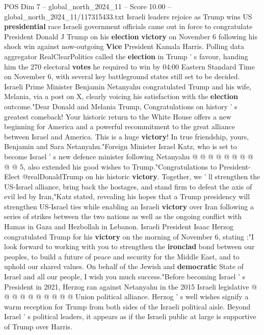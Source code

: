 \begin{textsample}{POS Dim 7 – global\_north\_2024\_11 – Score 10.00 – global\_north\_2024\_11/117315433.txt}  \label{ex:f7_pos_119}
Israeli leaders rejoice as Trump wins US \textbf{presidential} race Israeli government officials came out in force to congratulate President Donald J Trump on his \textbf{election} \textbf{victory} on November 6 following his shock win against now-outgoing \textbf{Vice} President Kamala Harris.
Polling data aggregator RealClearPolitics called the \textbf{election} in Trump ' s favour, handing him the 270 electoral \textbf{votes} he required to win by 04:00 Eastern Standard Time on November 6, with several key battleground states still set to be decided.
Israeli Prime Minister Benjamin Netanyahu congratulated Trump and his wife, Melania, via a post on X, clearly voicing his satisfaction with the \textbf{election} outcome."Dear Donald and Melania Trump, Congratulations on history ' s greatest comeback!
Your historic return to the White House offers a new beginning for America and a powerful recommitment to the great alliance between Israel and America.
This is a huge \textbf{victory}!
In true friendship, yours, Benjamin and Sara Netanyahu."Foreign Minister Israel Katz, who is set to become Israel ' s new defence minister following Netanyahu @ @ @ @ @ @ @ @ @ @ 5, also extended his good wishes to Trump."Congratulations to President-Elect @realDonaldTrump on his historic \textbf{victory}.
Together, we ' ll strengthen the US-Israel alliance, bring back the hostages, and stand firm to defeat the axis of evil led by Iran,"Katz stated, revealing his hopes that a Trump presidency will strengthen US-Israel ties while enabling an Israeli \textbf{victory} over Iran following a series of strikes between the two nations as well as the ongoing conflict with Hamas in Gaza and Hezbollah in Lebanon.
Israeli President Isaac Herzog congratulated Trump for his \textbf{victory} on the morning of November 6, stating :"I look forward to working with you to strengthen the \textbf{ironclad} bond between our peoples, to build a future of peace and security for the Middle East, and to uphold our shared values.
On behalf of the Jewish and \textbf{democratic} State of Israel and all our people, I wish you much success."Before becoming Israel ' s President in 2021, Herzog ran against Netanyahu in the 2015 Israeli legislative @ @ @ @ @ @ @ @ @ @ Union political alliance.
Herzog ' s well wishes signify a warm reception for Trump from both sides of the Israeli political aisle.
Beyond Israel ' s political leaders, it appears as if the Israeli public at large is supportive of Trump over Harris.

\end{textsample}
